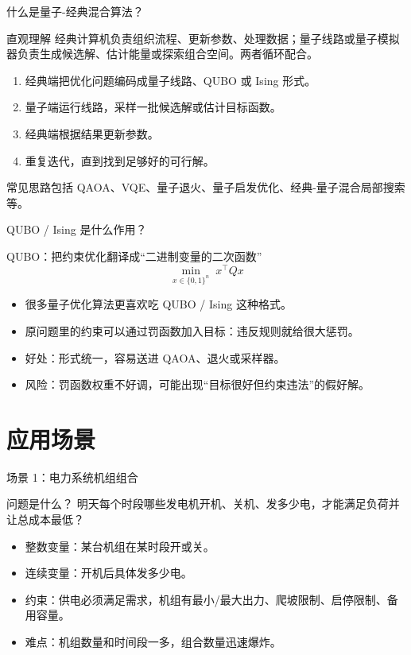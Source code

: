 \documentclass[aspectratio=169]{beamer}
\begin{document}
\begin{frame}{什么是量子-经典混合算法？}
\small
\begin{block}{直观理解}
  经典计算机负责组织流程、更新参数、处理数据；量子线路或量子模拟器负责生成候选解、估计能量或探索组合空间。两者循环配合。
\end{block}

\begin{enumerate}
  \item 经典端把优化问题编码成量子线路、QUBO 或 Ising 形式。
  \item 量子端运行线路，采样一批候选解或估计目标函数。
  \item 经典端根据结果更新参数。
  \item 重复迭代，直到找到足够好的可行解。
\end{enumerate}

\vspace{0.4em}
常见思路包括 QAOA、VQE、量子退火、量子启发优化、经典-量子混合局部搜索等。
\end{frame}

\begin{frame}{QUBO / Ising 是什么作用？}
\small
\begin{block}{QUBO：把约束优化翻译成“二进制变量的二次函数”}
\[
  \min_{x\in\{0,1\}^n} \; x^\top Qx
\]
\end{block}

\begin{itemize}
  \item 很多量子优化算法更喜欢吃 QUBO / Ising 这种格式。
  \item 原问题里的约束可以通过罚函数加入目标：违反规则就给很大惩罚。
  \item 好处：形式统一，容易送进 QAOA、退火或采样器。
  \item 风险：罚函数权重不好调，可能出现“目标很好但约束违法”的假好解。
\end{itemize}
\end{frame}

\section{应用场景}

\begin{frame}{场景 1：电力系统机组组合}
\small
\begin{block}{问题是什么？}
  明天每个时段哪些发电机开机、关机、发多少电，才能满足负荷并让总成本最低？
\end{block}

\begin{itemize}
  \item 整数变量：某台机组在某时段开或关。
  \item 连续变量：开机后具体发多少电。
  \item 约束：供电必须满足需求，机组有最小/最大出力、爬坡限制、启停限制、备用容量。
  \item 难点：机组数量和时间段一多，组合数量迅速爆炸。
\end{itemize}
\end{frame}
\end{document}
